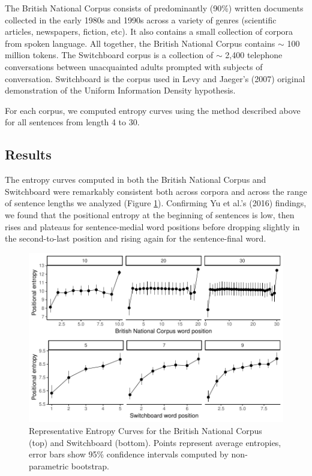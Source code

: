 \documentclass[10pt, letterpaper]{article}
\newenvironment{CodeChunk}{}{}
\begin{document}
The British National Corpus consists of predominantly (90\%) written
documents collected in the early 1980s and 1990s across a variety of
genres (scientific articles, newspapers, fiction, etc). It also contains
a small collection of corpora from spoken language. All together, the
British National Corpus contains \(\sim\) 100 million tokens. The
Switchboard corpus is a collection of \(\sim\) 2,400 telephone
conversations between unacquainted adults prompted with subjects of
conversation. Switchboard is the corpus used in Levy and Jaeger's (2007)
original demonstration of the Uniform Information Density hypothesis.

For each corpus, we computed entropy curves using the method described
above for all sentences from length 4 to 30.

\hypertarget{results}{%
\subsection{Results}\label{results}}

The entropy curves computed in both the British National Corpus and
Switchboard were remarkably consistent both across corpora and across
the range of sentence lengths we analyzed (Figure
\ref{fig:read_and_plot_exp1}). Confirming Yu et al.'s (2016) findings,
we found that the positional entropy at the beginning of sentences is
low, then rises and plateaus for sentence-medial word positions before
dropping slightly in the second-to-last position and rising again for
the sentence-final word.

\begin{CodeChunk}
\begin{figure}[tb]

{\centering \includegraphics{figs/read_and_plot_exp1-1} 

}

\caption[Representative Entropy Curves for the British National Corpus (top) and Switchboard (bottom)]{Representative Entropy Curves for the British National Corpus (top) and Switchboard (bottom). Points represent average entropies, error bars show 95\% confidence intervals computed by non-parametric bootstrap.}\label{fig:read_and_plot_exp1}
\end{figure}
\end{CodeChunk}
\end{document}
